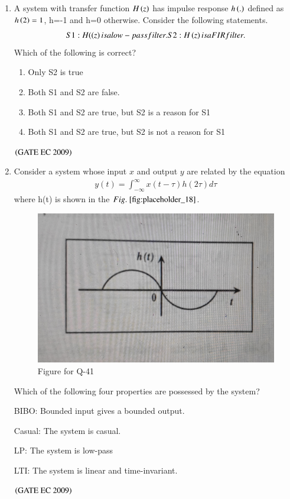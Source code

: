 \documentclass[journal,12pt,onecolumn]{IEEEtran}
\theoremstyle{remark}
\begin{document}
\begin{enumerate}[start=1, label={Q\arabic*.}]
\item A system with transfer function $H\left(z\right)$ has impulse response $h\left(.\right)$ defined as $h\left(2\right)=1$, h=-1 and h=0 otherwise. Consider the following statements.
\begin{align*}
    S1: H(\brak{z} is a low-pass filter.
    
    S2: H\brak{z} is a FIR filter.
\end{align*}
Which of the following is correct?
\begin{enumerate}
        \item Only S2 is true
        \item Both S1 and S2 are false.
        \item Both S1 and S2 are true, but S2 is a reason for S1
        \item Both S1 and S2 are true, but S2 is not a reason for S1
\end{enumerate}
\hfill $\left(\text{GATE EC 2009}\right)$

\item Consider a system whose input $x$ and output $y$ are related by the equation 
\begin{align*}
    y(t)= \int_{-\infty}^{\infty} x(t-\tau)h(2\tau)d\tau
\end{align*}
where h(t) is shown in the $\figref{fig:placeholder_18}$.
\begin{figure}[H]
    \centering
    \includegraphics[width=0.5\columnwidth]{figs/img_18.jpg}
    \caption{\centering Figure for Q-41}
    \label{fig:placeholder_18}
\end{figure}

Which of the following four properties are possessed by the system?

BIBO: Bounded input gives a bounded output.

Casual: The system is casual.

LP: The system is low-pass

LTI: The system is linear and time-invariant.
\begin{enumerate}
\end{enumerate}
\hfill $\left(\text{GATE EC 2009}\right)$


\end{enumerate}
\end{document}

